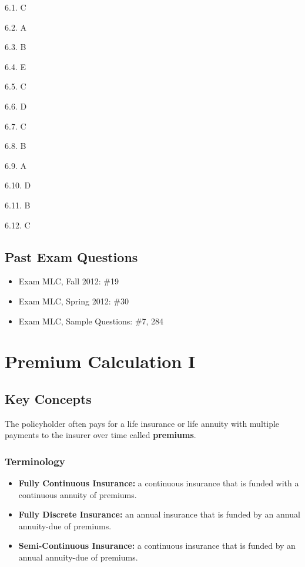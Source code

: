 \documentclass[]{book}
\begin{document}
6.1. C

6.2. A

6.3. B

6.4. E

6.5. C

6.6. D

6.7. C

6.8. B

6.9. A

6.10. D

6.11. B

6.12. C

\section{Past Exam Questions}\label{past-exam-questions-3}

\begin{itemize}
\item
  Exam MLC, Fall 2012: \#19
\item
  Exam MLC, Spring 2012: \#30
\item
  Exam MLC, Sample Questions: \#7, 284
\end{itemize}

\chapter{Premium Calculation I}\label{premium-calculation-i}

\section{Key Concepts}\label{key-concepts-2}

The policyholder often pays for a life insurance or life annuity with
multiple payments to the insurer over time called \textbf{premiums}.

\subsection{Terminology}\label{terminology}

\begin{itemize}
\item
  \textbf{Fully Continuous Insurance:} a continuous insurance that is
  funded with a continuous annuity of premiums.
\item
  \textbf{Fully Discrete Insurance:} an annual insurance that is funded
  by an annual annuity-due of premiums.
\item
  \textbf{Semi-Continuous Insurance:} a continuous insurance that is
  funded by an annual annuity-due of premiums.
\end{itemize}
\end{document}
